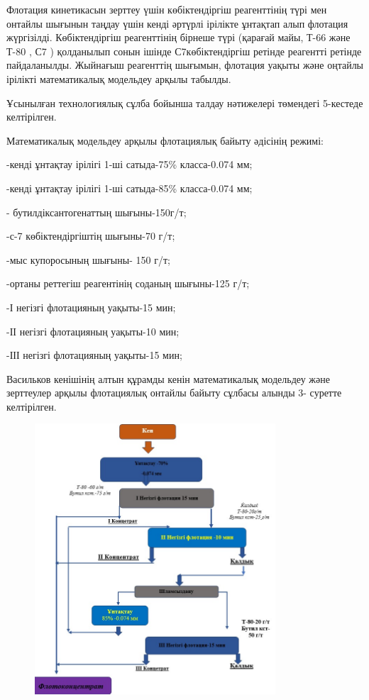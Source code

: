 Флотация кинетикасын зерттеу үшін көбіктендіргіш реагенттінің түрі мен
онтайлы шығынын таңдау үшін кенді әртүрлі ірілікте ұнтақтап алып
флотация жүргізілді. Көбіктендіргіш реагенттінің бірнеше түрі (қарағай
майы, Т-66 және Т-80 , С7 ) қолданылып сонын ішінде С7көбіктендіргіш
ретінде реагентті ретінде пайдаланылды. Жыйнағыш реагенттің шығымын,
флотация уақыты және оңтайлы ірілікті математикалық модельдеу арқылы
табылды.

Ұсынылған технологиялық сұлба бойынша талдау нәтижелері төмендегі
5-кестеде келтірілген.

Математикалық модельдеу арқылы флотациялық байыту әдісінің режимі:

-кенді ұнтақтау ірілігі 1-ші сатыда-75\% класса-0.074 мм;

-кенді ұнтақтау ірілігі 1-ші сатыда-85\% класса-0.074 мм;

- бутилдіксантогенаттың шығыны-150г/т;

-с-7 көбіктендіргіштің шығыны-70 г/т;

-мыс купоросының шығыны- 150 г/т;

-ортаны реттегіш реагентінің соданың шығыны-125 г/т;

-І негізгі флотацияның уақыты-15 мин;

-ІІ негізгі флотацияның уақыты-10 мин;

-ІІІ негізгі флотацияның уақыты-15 мин;

Васильков кенішінің алтын құрамды кенін математикалық модельдеу және
зерттеулер арқылы флотациялық онтайлы байыту сұлбасы алынды 3- суретте
келтірілген.

\begin{figure}[H]
	\centering
	\includegraphics[width=0.8\textwidth]{media/gor/image5}
	\caption*{}
\end{figure}


